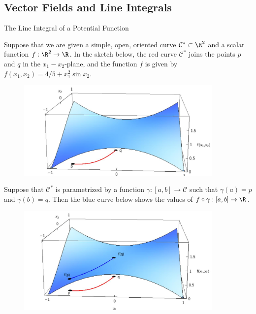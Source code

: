 \documentclass[smaller,hyperref={CJKbookmarks=true}]{beamer}
\begin{document}
\subsection{Vector Fields and Line Integrals}
\begin{frame}[c]
\begin{spacing}{2.5}
\tableofcontents[sectionstyle=hide,subsectionstyle=show/shaded/hide]
\end{spacing}
\end{frame}
\begin{frame}{The Line Integral of a Potential Function}
\begin{spacing}{1}
Suppose that we are given a simple, open, oriented curve $\mathcal{C}^*\subset\R^2$ and a scalar function $f:\R^2\to\R$. In the sketch below, the red curve $\mathcal{C}^*$ joins the points $p$ and $q$ in the $x_1-x_2$-plane, and the function $f$ is given by $f(x_1,x_2)=4/5+x_1^2\sin x_2$.
\begin{figure}
  \centering
  \includegraphics[width=0.9\textwidth]{55.jpg}

\end{figure}
\newpage
Suppose that $\mathcal{C}^*$ is parametrized by a function $\gamma:[a,b]\to\mathcal{C}$ such that $\gamma(a)=p$ and $\gamma(b)=q$. Then the blue curve below shows the values of $f\circ
\gamma:[a,b]\to\R$.
\begin{figure}
  \centering
  \includegraphics[width=0.9\textwidth]{56.jpg}


\end{figure}
\end{spacing}
\end{frame}
\end{document}
